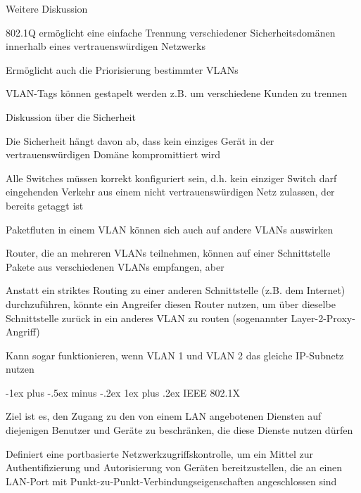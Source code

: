 \documentclass[a4paper]{article}
\makeatletter
\renewcommand{\subsubsection}{\@startsection{subsubsection}{3}{0mm}%
 {-1ex plus -.5ex minus -.2ex}%
 {1ex plus .2ex}%
 {\normalfont\small\bfseries}}
\makeatother
\begin{document}
\begin{multicols}{3}
      Weitere Diskussion
      \begin{itemize*}
            \item 802.1Q ermöglicht eine einfache Trennung verschiedener Sicherheitsdomänen innerhalb eines vertrauenswürdigen Netzwerks
            \item Ermöglicht auch die Priorisierung bestimmter VLANs %
            \item VLAN-Tags können gestapelt werden z.B. um verschiedene Kunden zu trennen%
      \end{itemize*}

      Diskussion über die Sicherheit
      \begin{itemize*}
            \item Die Sicherheit hängt davon ab, dass kein einziges Gerät in der vertrauenswürdigen Domäne kompromittiert wird
            \item Alle Switches müssen korrekt konfiguriert sein, d.h. kein einziger Switch darf eingehenden Verkehr aus einem nicht vertrauenswürdigen Netz zulassen, der bereits getaggt ist
            \item Paketfluten in einem VLAN können sich auch auf andere VLANs auswirken
            \item Router, die an mehreren VLANs teilnehmen, können auf einer Schnittstelle Pakete aus verschiedenen VLANs empfangen, aber
            \item Anstatt ein striktes Routing zu einer anderen Schnittstelle (z.B. dem Internet) durchzuführen, könnte ein Angreifer diesen Router nutzen, um über dieselbe Schnittstelle zurück in ein anderes VLAN zu routen (sogenannter Layer-2-Proxy-Angriff)
            \item Kann sogar funktionieren, wenn VLAN 1 und VLAN 2 das gleiche IP-Subnetz nutzen
      \end{itemize*}

      \subsubsection{IEEE 802.1X}
      \begin{itemize*}
            \item Ziel ist es, den Zugang zu den von einem LAN angebotenen Diensten auf diejenigen Benutzer und Geräte zu beschränken, die diese Dienste nutzen dürfen
            \item Definiert eine portbasierte Netzwerkzugriffskontrolle, um ein Mittel zur Authentifizierung und Autorisierung von Geräten bereitzustellen, die an einen LAN-Port mit Punkt-zu-Punkt-Verbindungseigenschaften angeschlossen sind
      \end{itemize*}


\end{multicols}
\end{document}
